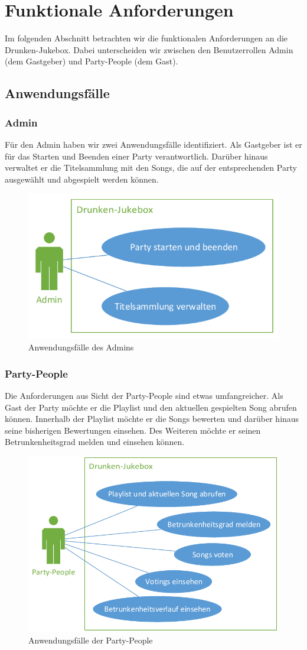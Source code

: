 \section{Funktionale Anforderungen}
Im folgenden Abschnitt betrachten wir die funktionalen Anforderungen an die Drunken-Jukebox. Dabei unterscheiden wir zwischen den Benutzerrollen Admin (dem Gastgeber) und Party-People (dem Gast).  

\subsection{Anwendungsfälle}
\subsubsection{Admin}
Für den Admin haben wir zwei Anwendungsfälle identifiziert. Als Gastgeber ist er für das Starten und Beenden einer Party verantwortlich. Darüber hinaus verwaltet er die Titelsammlung mit den Songs, die auf der entsprechenden Party ausgewählt und abgespielt werden können.

\begin{figure}[H]
\centering
\includegraphics[width=0.75\linewidth]{Bilder/AdminUseCase}
\caption{Anwendungsfälle des Admins}
\label{fig:AdminUseCase}
\end{figure}

\newpage
\subsubsection{Party-People}
Die Anforderungen aus Sicht der Party-People sind etwas umfangreicher. Als Gast der Party möchte er die Playlist und den aktuellen gespielten Song abrufen können. Innerhalb der Playlist möchte er die Songs bewerten und darüber hinaus seine bisherigen Bewertungen einsehen. Des Weiteren möchte er seinen Betrunkenheitsgrad melden und einsehen können.

\begin{figure}[H]
\centering
\includegraphics[width=0.95\linewidth]{Bilder/PartyPeopleUseCase}
\caption{Anwendungsfälle der Party-People}
\label{fig:PartyPeopleUseCase}
\end{figure}
